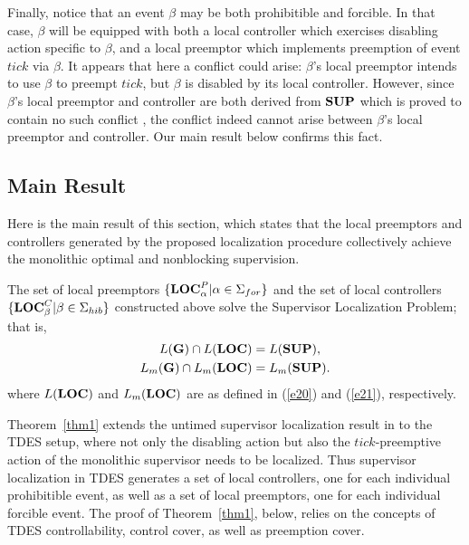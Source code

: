 \documentclass[twocolumn]{autart}
\begin{document}
Finally, notice that an event $\beta$ may be both prohibitible and
forcible. In that case, $\beta$ will be equipped with both a local
controller which exercises disabling action specific to $\beta$, and
a local preemptor which implements preemption of event $tick$ via
$\beta$. It appears that here a conflict could arise: $\beta$'s
local preemptor intends to use $\beta$ to preempt $tick$, but
$\beta$ is disabled by its local controller.  However, since
$\beta$'s local preemptor and controller are both derived from $\bf
SUP$ which is proved to contain no such conflict
\cite{BrandinWonham:94,Wonham:2011a}, the conflict indeed cannot
arise between $\beta$'s local preemptor and controller. Our main
result below confirms this fact.

\subsection{Main Result}\label{sec:4.3:main}

Here is the main result of this section, which states that the local
preemptors and controllers generated by the proposed localization
procedure collectively achieve the monolithic optimal and
nonblocking supervision.

\begin{thm} \label{thm1}
The set of local preemptors $\{{\bf LOC}^P_{\alpha}|\alpha \in
\Sigma_{for}\}$ and the set of local controllers $\{{\bf
LOC}^C_{\beta}|\beta \in \Sigma_{hib}\}$ constructed above solve the
Supervisor Localization Problem; that is,
\begin{align}
   L({\bf G}) \cap L({\bf LOC}) &= L({\bf SUP}), \label{e38}\\
   L_m({\bf G}) \cap L_m({\bf LOC}) &= L_m({\bf SUP}). \label{e39}
\end{align}
where $L({\bf LOC})$ and $L_m({\bf LOC})$ are as defined in (\ref{e20}) and (\ref{e21}), respectively.
\end{thm}

Theorem~\ref{thm1} extends the untimed supervisor localization
result in \cite{CaiWonham:2010a} to the TDES setup, where not only
the disabling action but also the $tick$-preemptive action of the
monolithic supervisor needs to be localized.  Thus supervisor
localization in TDES generates a set of local controllers,
 one for each individual prohibitible event, as well as
a set of local preemptors, one for each individual
forcible event. The proof of Theorem~\ref{thm1}, below,
relies on the concepts of TDES controllability, control cover, as
well as preemption cover.
\end{document}
